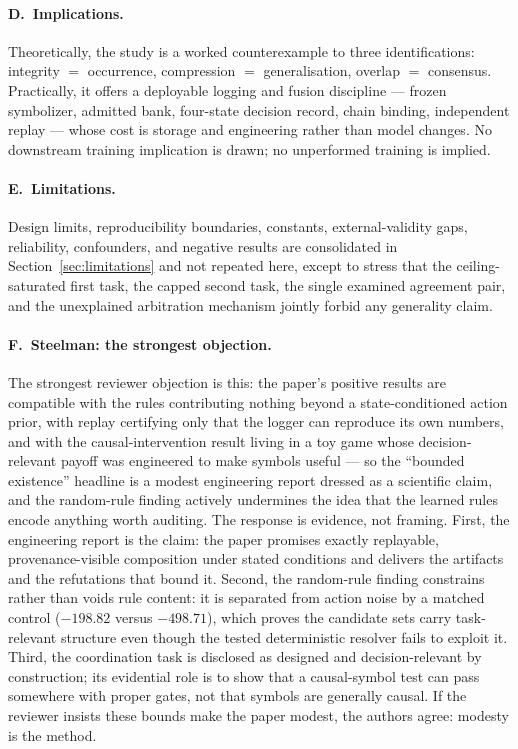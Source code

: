 \documentclass[11pt,a4paper]{article}
\theoremstyle{definition}
\begin{document}
\paragraph{D.~Implications.}
Theoretically, the study is a worked counterexample to three identifications:
integrity $=$ occurrence, compression $=$ generalisation, overlap $=$
consensus. Practically, it offers a deployable logging and fusion discipline
--- frozen symbolizer, admitted bank, four-state decision record, chain
binding, independent replay --- whose cost is storage and engineering rather
than model changes. No downstream training implication is drawn; no
unperformed training is implied.

\paragraph{E.~Limitations.}
Design limits, reproducibility boundaries, constants, external-validity gaps,
reliability, confounders, and negative results are consolidated in
Section~\ref{sec:limitations} and not repeated here, except to stress that
the ceiling-saturated first task, the capped second task, the single examined
agreement pair, and the unexplained arbitration mechanism jointly forbid any
generality claim.

\paragraph{F.~Steelman: the strongest objection.}
The strongest reviewer objection is this: the paper's positive results are
compatible with the rules contributing nothing beyond a state-conditioned
action prior, with replay certifying only that the logger can reproduce its
own numbers, and with the causal-intervention result living in a toy game
whose decision-relevant payoff was engineered to make symbols useful --- so
the ``bounded existence'' headline is a modest engineering report dressed as
a scientific claim, and the random-rule finding actively undermines the idea
that the learned rules encode anything worth auditing. The response is
evidence, not framing. First, the engineering report is the claim: the paper
promises exactly replayable, provenance-visible composition under stated
conditions and delivers the artifacts and the refutations that bound it.
Second, the random-rule finding constrains rather than voids rule content: it
is separated from action noise by a matched control ($-198.82$ versus
$-498.71$), which proves the candidate sets carry task-relevant structure
even though the tested deterministic resolver fails to exploit it. Third, the
coordination task is disclosed as designed and decision-relevant by
construction; its evidential role is to show that a causal-symbol test can
pass somewhere with proper gates, not that symbols are generally causal. If
the reviewer insists these bounds make the paper modest, the authors agree:
modesty is the method.
\end{document}
